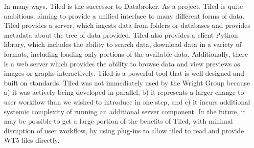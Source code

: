 In many ways, Tiled is the successor to Databroker.
As a project, Tiled is quite ambitious, aiming to provide a unified interface to many different forms of data.
Tiled provides a server, which ingests data from folders or databases and provides metadata about the tree of data provided.
Tiled also provides a client Python library, which includes the ability to search data, download data in a variety of formats, including loading only portions of the available data.
Additionally, there is a web server which provides the ability to browse data and view previews as images or graphs interactively.
Tiled is a powerful tool that is well designed and built on standards.
Tiled was not immediately used by the Wright Group because a) it was actively being developed in parallel,  b) it represents a larger change to user workflow than we wished to introduce in one step, and c) it incurs additional systemic complexity of running an additional server component.
In the future, it may be possible to get a large portion of the benefits of Tiled, with minimal disruption of user workflow, by using plug-ins to allow tiled to read and provide WT5 files directly.


\clearpage

